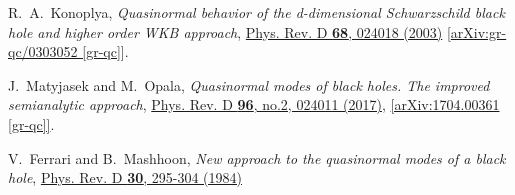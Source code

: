 \documentclass[pr, twocolumn, preprintnumbers, showpacs,footnoteadded, superscriptaddress,nofootinbib,longbibliography]{revtex4-1}
\begin{document}
\begin{thebibliography}{99}
R.~A.~Konoplya,
\emph{Quasinormal behavior of the d-dimensional Schwarzschild black hole and higher order WKB approach},
\href{https://journals.aps.org/prd/abstract/10.1103/PhysRevD.68.024018}{Phys. Rev. D \textbf{68}, 024018 (2003)}
[\href{https://arxiv.org/pdf/gr-qc/0303052.pdf}{arXiv:gr-qc/0303052 [gr-qc]}].


J.~Matyjasek and M.~Opala,
\emph{Quasinormal modes of black holes. The improved semianalytic approach},
\href{https://journals.aps.org/prd/abstract/10.1103/PhysRevD.96.024011}
{Phys. Rev. D \textbf{96}, no.2, 024011 (2017),}
\href{https://arxiv.org/pdf/1704.00361.pdf}{[arXiv:1704.00361 [gr-qc]]}.



V.~Ferrari and B.~Mashhoon,
\emph{New approach to the quasinormal modes of a black hole},
\href{https://journals.aps.org/prd/abstract/10.1103/PhysRevD.30.295}{Phys. Rev. D \textbf{30}, 295-304 (1984)}
\end{thebibliography}
\end{document}
